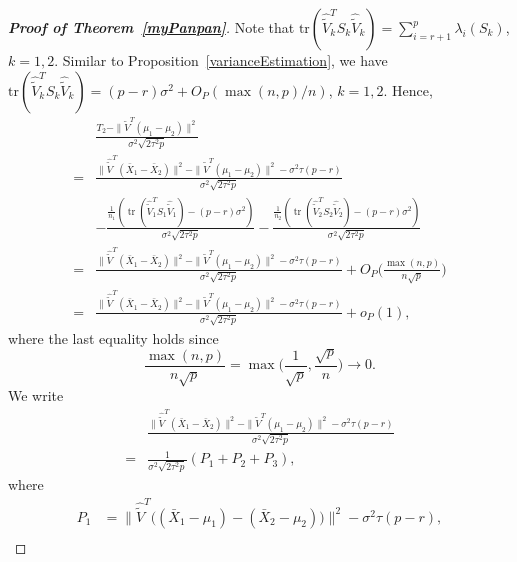 \documentclass[review]{elsarticle}
\DeclareMathOperator{\mytr}{tr}
\theoremstyle{plain}
\theoremstyle{definition}
\theoremstyle{remark}
\begin{document}
\begin{proof}[\textbf{Proof of Theorem~\ref{myPanpan}}]

    Note that $\mathrm{tr}(\hat{\tilde{V}}_k^T S_k\hat{\tilde{V}}_k)=\sum_{i=r+1}^p \lambda_i(S_k)$, $k=1,2$.
    Similar to Proposition~\ref{varianceEstimation}, we have $\mathrm{tr}(\hat{\tilde{V}}_k^T S_k\hat{\tilde{V}}_k)=(p-r)\sigma^2+O_P({\max(n,p)}/{n})$, $k=1,2$.
    Hence,
\begin{equation*}
    \begin{aligned}
        &\frac{T_2-\|\tilde{V}^T(\mu_1-\mu_2)\|^2}{\sigma^2\sqrt{2\tau^2 p}}\\
        =&
        \frac{\|\hat{\tilde{V}}^T(\bar{X}_1-\bar{X}_2)\|^2-\|\tilde{V}^T(\mu_1-\mu_2)\|^2
        -\sigma^2\tau (p-r)
        }{\sigma^2\sqrt{2\tau^2 p}}\\
        &-\frac{
        \frac{1}{n_1}(\mytr(\hat{\tilde{V}}_1^T S_1\hat{\tilde{V}}_1)-(p-r)\sigma^2)
        }{\sigma^2\sqrt{2\tau^2 p}}
-\frac{
        \frac{1}{n_2}(\mytr(\hat{\tilde{V}}_2^T S_2\hat{\tilde{V}}_2)-(p-r)\sigma^2)
        }{\sigma^2\sqrt{2\tau^2 p}}
        \\
        =&
        \frac{\|\hat{\tilde{V}}^T(\bar{X}_1-\bar{X}_2)\|^2-\|\tilde{V}^T(\mu_1-\mu_2)\|^2
        -\sigma^2\tau (p-r)
        }{\sigma^2\sqrt{2\tau^2 p}}
        +O_P\Big(\frac{\max(n,p)}{n\sqrt{p}}\Big)\\
        =&
        \frac{\|\hat{\tilde{V}}^T(\bar{X}_1-\bar{X}_2)\|^2-\|\tilde{V}^T(\mu_1-\mu_2)\|^2
        -\sigma^2\tau (p-r)
        }{\sigma^2\sqrt{2\tau^2 p}}+o_P(1),
    \end{aligned}
\end{equation*}
where the last equality holds since
    $$\frac{\max(n,p)}{n\sqrt{p}}=\max\Big(\frac{1}{\sqrt{p}},\frac{\sqrt{p}}{n}\Big)\to 0.$$
    We write
\begin{equation*}
    \begin{aligned}
        &\frac{\|\hat{\tilde{V}}^T(\bar{X}_1-\bar{X}_2)\|^2-\|\tilde{V}^T(\mu_1-\mu_2)\|^2
        -\sigma^2\tau (p-r)
        }{\sigma^2\sqrt{2\tau^2 p}}
        \\
        =&\frac{1}{\sigma^2\sqrt{2\tau^2 p}}(
        P_1+P_2+P_3
        ),
    \end{aligned}
\end{equation*}
where
\begin{align*}
    P_1&=\|\hat{\tilde{V}}^T\big((\bar{X}_1-\mu_1)-(\bar{X}_2-\mu_2)\big)\|^2-\sigma^2 \tau (p-r),\\

\end{align*}
\end{proof}
\end{document}
